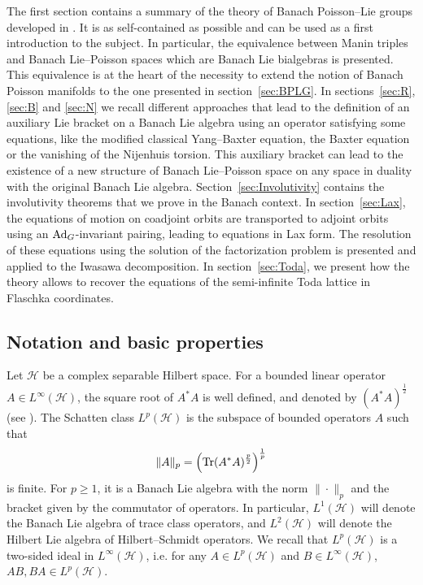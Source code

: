 \documentclass[a4paper,12pt,reqno]{amsart}%
\theoremstyle{definition}
\theoremstyle{remark}
\numberwithin{theorem}{section}
\numberwithin{equation}{section}
\newcommand{\1}{{\bf 1}}
\DeclareMathOperator{\Ad}{\textnormal{Ad}}
\DeclareMathOperator{\Tr}{\textnormal{Tr}}
\begin{document}
The first section contains a summary of the theory of Banach Poisson--Lie groups developed in \cite{tumpach-bruhat}. It is as self-contained as possible and can be used as a first introduction to the subject. In particular, the equivalence between Manin triples and Banach Lie--Poisson spaces which are Banach Lie bialgebras is presented. This equivalence is at the heart of the necessity to extend the notion of Banach Poisson manifolds to the one presented in section~\ref{sec:BPLG}. In sections~\ref{sec:R}, \ref{sec:B} and \ref{sec:N} we recall different approaches that lead to the definition of an auxiliary Lie bracket on a Banach Lie algebra using an operator satisfying some equations, like the modified classical Yang--Baxter equation, the Baxter equation or the vanishing of the Nijenhuis torsion. This auxiliary bracket can lead to the existence of a new structure of Banach Lie--Poisson space on any space in duality with the original Banach Lie algebra. Section~\ref{sec:Involutivity} contains the involutivity theorems that we prove in the Banach context. In section~\ref{sec:Lax}, the equations of motion on coadjoint orbits are transported to adjoint orbits using an $\Ad_G$-invariant pairing, leading to equations in Lax form. The resolution of these equations using the solution of the factorization problem is presented and applied to the Iwasawa decomposition. In section~\ref{sec:Toda}, we present how the theory allows to recover the equations of the semi-infinite Toda lattice in Flaschka coordinates.

\subsection{Notation and basic properties}
Let $\mathcal H$ be a complex separable Hilbert space. For a bounded linear operator $A\in L^\infty(\mathcal H)$, the square root of $A^*A$ is well defined, and denoted by $(A^*A)^{\frac{1}{2}}$ (see  \cite[Theorem VI.9]{reed1}).
The Schatten class $L^{p}(\mathcal{H})$ is the subspace of bounded operators $A$ such that
\[\|A\|_p = \left(\Tr (A^*A)^{\frac{p}{2}}\right)^\frac{1}{p}\]
is finite. For $p\geq 1$, it is a Banach Lie algebra with the norm $\|\cdot \|_p$ and the bracket given by the commutator of operators. In particular, $L^1(\mathcal{H})$ will denote the Banach Lie algebra of trace class operators, and $L^2(\mathcal{H})$ will denote the Hilbert Lie algebra of Hilbert--Schmidt operators. We recall that $L^{p}(\mathcal{H})$ is a two-sided ideal in $L^\infty(\mathcal H)$, i.e. for any $A \in L^{p}(\mathcal{H})$ and $B \in L^{\infty}(\mathcal{H})$, $AB, BA \in L^{p}(\mathcal{H})$.
\end{document}
